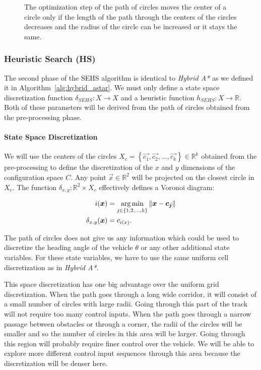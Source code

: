 \begin{figure}
	\centering
	\caption{The optimization step of the path of circles moves the center of a circle only if the length of the path through the centers of the circles decreases and the radius of the circle can be increased or it stays the same.}
	\label{fig:sehs_space_exploration_optimization}
\end{figure}

\subsubsection{Heuristic Search (HS)}

The second phase of the \gls*{SEHS} algorithm is identical to \textit{Hybrid A*} as we defined it in Algorithm~\ref{alg:hybrid_astar}. We must only define a state space discretization function $\delta_{SEHS}: X\rightarrow X$ and a heuristic function $h_{SEHS}: X\rightarrow \mathbb{R}$. Both of these parameters will be derived from the path of circles obtained from the pre-processing phase.

\paragraph{State Space Discretization}
We will use the centers of the circles $X_c=\left\{\vec{c_1}, \vec{c_2}, \ldots, \vec{c_k} \right\}\in \mathbb{R}^k$ obtained from the pre-processing to define the discretization of the $x$ and $y$ dimensions of the configuration space $C$. Any point $\vec{x}\in \mathbb{R}^2$ will be projected on the closest circle in $X_c$. The function $\delta_{x,y}:\mathbb{R}^2\times X_c$ effectively defines a Voronoi diagram:

\begin{equation*}
\begin{aligned}
i(\bm{x})&=\operatorname*{arg\,min}_{j\in \left\{1, 2, \ldots, k\right\}} \left\lVert\bm{x}-\bm{c_j}\right\rVert \\
\delta_{x,y}(\bm{x})&=c_{i(x)}.
\end{aligned}
\end{equation*}

The path of circles does not give us any information which could be used to discretize the heading angle of the vehicle $\theta$ or any other additional state variables. For these state variables, we have to use the same uniform cell discretization as in \textit{Hybrid A*}.

This space discretization has one big advantage over the uniform grid discretization. When the path goes through a long wide corridor, it will consist of a small number of circles with large radii. Going through this part of the track will not require too many control inputs. When the path goes through a narrow passage between obstacles or through a corner, the radii of the circles will be smaller and so the number of circles in this area will be larger. Going through this region will probably require finer control over the vehicle. We will be able to explore more different control input sequences through this area because the discretization will be denser here.

